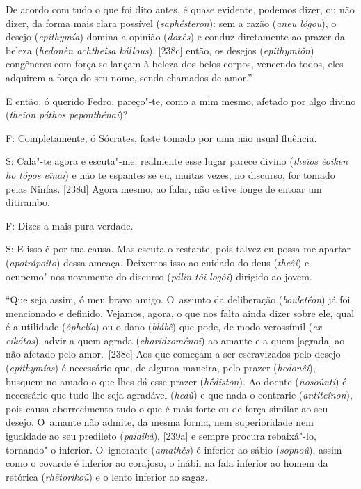 De acordo com tudo o que foi dito antes, é quase evidente, podemos
dizer, ou não dizer, da forma mais clara possível (\emph{saphésteron}):
sem a razão (\emph{aneu lógou}), o desejo (\emph{epithymía}) domina a
opinião (\emph{doxês}) e conduz diretamente ao prazer da beleza
(\emph{hedonèn achtheîsa kállous}), [238c] então, os desejos
(\emph{epithymiôn}) congêneres com força se lançam à beleza dos belos
corpos, vencendo todos, eles adquirem a força do seu nome, sendo
chamados de amor.''

 

E então, ó querido Fedro, pareço"-te, como a mim mesmo, afetado por algo
divino (\emph{theion páthos peponthénai})?

 

F: Completamente, ó Sócrates, foste tomado por uma não usual fluência.

 

S: Cala"-te agora e escuta"-me: realmente esse lugar parece divino
(\emph{theîos éoiken ho tópos eînai}) e não te espantes se eu, muitas
vezes, no discurso, for tomado pelas Ninfas. [238d] Agora mesmo, ao
falar, não estive longe de entoar um ditirambo.

 

F: Dizes a mais pura verdade.

 

S: E isso é por tua causa. Mas escuta o restante, pois talvez eu possa
me apartar (\emph{apotrápoito}) dessa ameaça. Deixemos isso ao cuidado
do deus (\emph{theôi}) e ocupemo"-nos novamente do discurso (\emph{pálin
tôi logôi}) dirigido ao jovem.

 

``Que seja assim, ó meu bravo amigo. O~assunto da deliberação
(\emph{bouletéon}) já foi mencionado e definido. Vejamos, agora, o que
nos falta ainda dizer sobre ele, qual é a utilidade (\emph{ôphelía}) ou
o dano (\emph{blábê}) que pode, de modo verossímil (\emph{ex eikótos}),
advir a quem agrada (\emph{charidzoménoi}) ao amante e a quem
[agrada] ao não afetado pelo amor.~[238e] Aos que começam a ser
escravizados pelo desejo (\emph{epithymías}) é necessário que, de alguma
maneira, pelo prazer (\emph{hedonêi}), busquem no amado o que lhes dá
esse prazer (\emph{hḗdiston}). Ao doente (\emph{nosoûnti}) é necessário
que tudo lhe seja agradável (\emph{hedù}) e que nada o contrarie
(\emph{antiteînon}), pois causa aborrecimento tudo o que é mais forte ou
de força similar ao seu desejo. O~amante não admite, da mesma forma, nem
superioridade nem igualdade ao seu predileto (\emph{paidikà}),
[239a] e sempre procura rebaixá"-lo, tornando"-o inferior. O~ignorante
(\emph{amathḕs}) é inferior ao sábio (\emph{sophoû}), assim como o
covarde é inferior ao corajoso, o inábil na fala inferior ao homem da
retórica (\emph{rhētorikoũ}) e o lento inferior ao sagaz.

